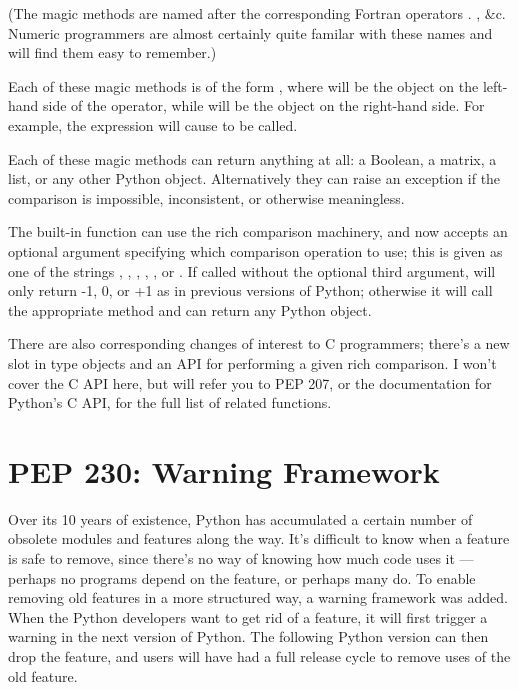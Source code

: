\documentclass{howto}
\begin{document}
(The magic methods are named after the corresponding Fortran operators
. , \&c.  Numeric programmers are almost
certainly quite familar with these names and will find them easy to
remember.)
 
Each of these magic methods is of the form , where  will be the object on the left-hand side of
the operator, while  will be the object on the right-hand
side.  For example, the expression  will cause
 to be called.

Each of these magic methods can return anything at all: a Boolean, a
matrix, a list, or any other Python object.  Alternatively they can
raise an exception if the comparison is impossible, inconsistent, or
otherwise meaningless.

The built-in  function can use the rich comparison
machinery, and now accepts an optional argument specifying which
comparison operation to use; this is given as one of the strings
, , , , , or
.  If called without the optional third argument,
 will only return -1, 0, or +1 as in previous versions
of Python; otherwise it will call the appropriate method and can
return any Python object.

There are also corresponding changes of interest to C programmers;
there's a new slot  in type objects and an API for
performing a given rich comparison.  I won't cover the C API here, but
will refer you to PEP 207, or the documentation for Python's C API,
for the full list of related functions.

\begin{seealso}


\end{seealso}

\section{PEP 230: Warning Framework}

Over its 10 years of existence, Python has accumulated a certain
number of obsolete modules and features along the way.  It's difficult
to know when a feature is safe to remove, since there's no way of
knowing how much code uses it --- perhaps no programs depend on the
feature, or perhaps many do.  To enable removing old features in a
more structured way, a warning framework was added.  When the Python
developers want to get rid of a feature, it will first trigger a
warning in the next version of Python.  The following Python version
can then drop the feature, and users will have had a full release
cycle to remove uses of the old feature.  
\end{document}
